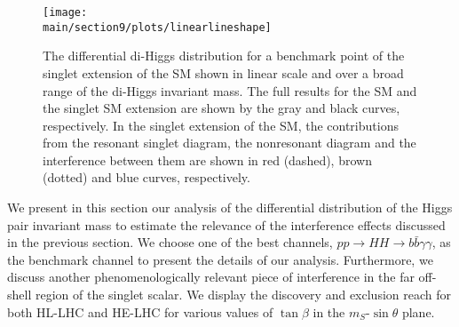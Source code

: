 \begin{figure}[t]  
  \centering
  \texttt{[image: \\main/section9/plots/linearlineshape]}
  \caption{
  The differential di-Higgs distribution for a benchmark point of the singlet extension of the SM shown in linear scale and over a broad range of the di-Higgs invariant mass. The full results for the SM and the singlet SM extension  are shown by the  gray and black curves, respectively. In the singlet extension of the SM, the contributions from the resonant singlet diagram, the nonresonant diagram and the interference between them are shown in red (dashed), brown (dotted) and blue curves, respectively.  
  }
  \label{fig:phenoshape} 
\end{figure}

We present in this section our analysis of the differential distribution of the Higgs pair invariant mass to estimate the relevance of the interference effects discussed in the previous section. We choose one of the best channels, $pp\to HH \to b\bar b \gamma\gamma$, as the benchmark channel to present the details of our analysis. Furthermore, we discuss another phenomenologically relevant piece of interference in the far off-shell region of the singlet scalar. We display the discovery and exclusion reach  for both HL-LHC and HE-LHC  for various values of $\tan\beta$ in the $m_S$-$\sin\theta$ plane. 


